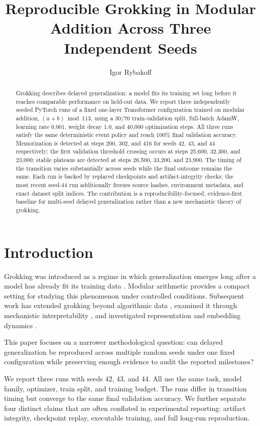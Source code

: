 \documentclass[11pt]{article}
\title{Reproducible Grokking in Modular Addition Across Three Independent Seeds}
\author{Igor Rybakoff}
\date{}
\begin{document}
\maketitle

\begin{abstract}
Grokking describes delayed generalization: a model fits its training set long before it reaches comparable performance on held-out data. We report three independently seeded PyTorch runs of a fixed one-layer Transformer configuration trained on modular addition, $(a+b)\bmod 113$, using a 30/70 train-validation split, full-batch AdamW, learning rate 0.001, weight decay 1.0, and 40{,}000 optimization steps. All three runs satisfy the same deterministic event policy and reach 100\% final validation accuracy. Memorization is detected at steps 200, 302, and 416 for seeds 42, 43, and 44 respectively; the first validation threshold crossing occurs at steps 25{,}600, 32{,}300, and 23{,}000; stable plateaus are detected at steps 26{,}500, 33{,}200, and 23{,}900. The timing of the transition varies substantially across seeds while the final outcome remains the same. Each run is backed by replayed checkpoints and artifact-integrity checks; the most recent seed-44 run additionally freezes source hashes, environment metadata, and exact dataset split indices. The contribution is a reproducibility-focused, evidence-first baseline for multi-seed delayed generalization rather than a new mechanistic theory of grokking.
\end{abstract}

\section{Introduction}
Grokking was introduced as a regime in which generalization emerges long after a model has already fit its training data \cite{power2022grokking}. Modular arithmetic provides a compact setting for studying this phenomenon under controlled conditions. Subsequent work has extended grokking beyond algorithmic data \cite{liu2022omnigrok}, examined it through mechanistic interpretability \cite{nanda2023progress}, and investigated representation and embedding dynamics \cite{alquboj2025embedding}.

This paper focuses on a narrower methodological question: can delayed generalization be reproduced across multiple random seeds under one fixed configuration while preserving enough evidence to audit the reported milestones?

We report three runs with seeds 42, 43, and 44. All use the same task, model family, optimizer, train split, and training budget. The runs differ in transition timing but converge to the same final validation accuracy. We further separate four distinct claims that are often conflated in experimental reporting: artifact integrity, checkpoint replay, executable training, and full long-run reproduction.
\end{document}
